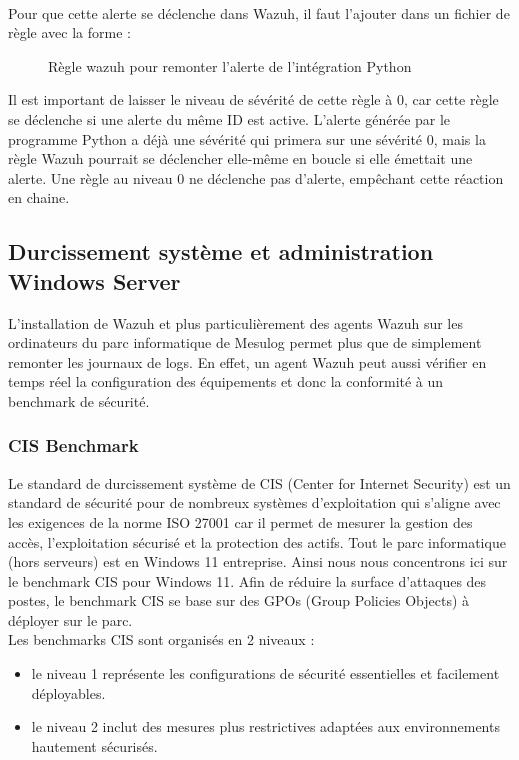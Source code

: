 \documentclass[a4paper, 11pt]{article}
\begin{document}
\\
Pour que cette alerte se déclenche dans Wazuh, il faut l'ajouter dans un fichier de règle avec la forme :
\begin{figure}[H]
  \centering
  
  \label{fig:api-wazuh}
  \caption{Règle wazuh pour remonter l'alerte de l'intégration Python}
\end{figure}
\par\bigskip
Il est important de laisser le niveau de sévérité de cette règle à 0, car cette règle se déclenche si une alerte du même ID est active. L'alerte générée par le programme Python a déjà une sévérité qui primera sur une sévérité 0, mais la règle Wazuh pourrait se déclencher elle-même en boucle si elle émettait une alerte. Une règle au niveau 0 ne déclenche pas d'alerte, empêchant cette réaction en chaine.
\newpage
\subsection{Durcissement système et administration Windows Server}

L'installation de Wazuh et plus particulièrement des agents Wazuh sur les ordinateurs du parc informatique de Mesulog permet plus que de simplement remonter les journaux de logs. En effet, un agent Wazuh peut aussi vérifier en temps réel la configuration des équipements et donc la conformité à un benchmark de sécurité.

\subsubsection{CIS Benchmark}

Le standard de durcissement système de CIS (Center for Internet Security) est un standard de sécurité pour de nombreux systèmes d'exploitation qui s'aligne avec les exigences de la norme ISO 27001 car il permet de mesurer la gestion des accès, l'exploitation sécurisé et la protection des actifs. Tout le parc informatique (hors serveurs) est en Windows 11 entreprise. Ainsi nous nous concentrons ici sur le benchmark CIS pour Windows 11. Afin de réduire la surface d'attaques des postes, le benchmark CIS se base sur des GPOs (Group Policies Objects) à déployer sur le parc.\\
Les benchmarks CIS sont organisés en 2 niveaux :
  \par\bigskip
  \begin{itemize}
    \item[$\bullet$] le niveau 1 représente les configurations de sécurité essentielles et facilement déployables.
    \item[$\bullet$] le niveau 2 inclut des mesures plus restrictives adaptées aux environnements hautement sécurisés.
  \end{itemize}
  \par\bigskip
  
\end{document}
